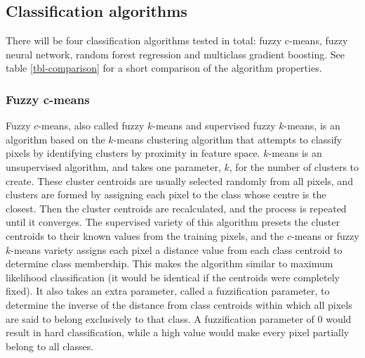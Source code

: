 \documentclass[a4paper,10pt]{article}
\begin{document}
\subsection{Classification algorithms}

There will be four classification algorithms tested in total: fuzzy c-means, fuzzy neural network, random forest regression and multiclass gradient boosting. See table \ref{tbl-comparison} for a short comparison of the algorithm properties.

\begin{table}
  \begin{center}
  \end{center}
  \caption{Feature comparison between classification algorithms whose classification accuracy will be compared in the thesis.}
  \label{tbl-comparison}
\end{table}

\subsubsection{Fuzzy c-means}

Fuzzy $c$-means, also called fuzzy $k$-means and supervised fuzzy $k$-means, is an algorithm based on the $k$-means clustering algorithm that attempts to classify pixels by identifying clusters by proximity in feature space. $k$-means is an unsupervised algorithm, and takes one parameter, $k$, for the number of clusters to create. These cluster centroids are usually selected randomly from all pixels, and clusters are formed by assigning each pixel to the class whose centre is the closest. Then the cluster centroids are recalculated, and the process is repeated until it converges. The supervised variety of this algorithm presets the cluster centroids to their known values from the training pixels, and the $c$-means or fuzzy $k$-means variety assigns each pixel a distance value from each class centroid to determine class membership. This makes the algorithm similar to maximum likelihood classification (it would be identical if the centroids were completely fixed). It also takes an extra parameter, called a fuzzification parameter, to determine the inverse of the distance from class centroids within which all pixels are said to belong exclusively to that class. A fuzzification parameter of 0 would result in hard classification, while a high value would make every pixel partially belong to all classes. \citep{hengl2004fuzzycmeans}
\end{document}
